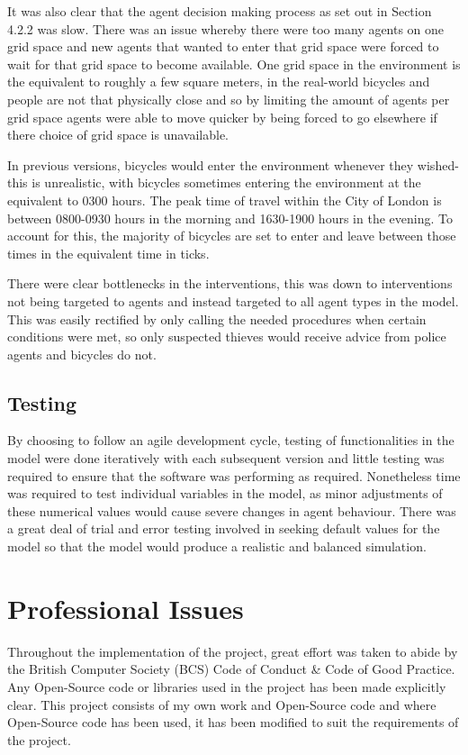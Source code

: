 \documentclass[11pt]{informatics-report}
\begin{document}
It was also clear that the agent decision making process as set out in Section 4.2.2 was slow. There was an issue whereby there were too many agents on one grid space and new agents that wanted to enter that grid space were forced to wait for that grid space to become available. One grid space in the environment is the equivalent to roughly a few square meters, in the real-world bicycles and people are not that physically close and so by limiting the amount of agents per grid space agents were able to move quicker by being forced to go elsewhere if there choice of grid space is unavailable. \par

In previous versions, bicycles would enter the environment whenever they wished- this is unrealistic, with bicycles sometimes entering the environment at the equivalent to 0300 hours. The peak time of travel within the City of London is between 0800-0930 hours in the morning and 1630-1900 hours in the evening. To account for this, the majority of bicycles are set to enter and leave between those times in the equivalent time in ticks. \par

There were clear bottlenecks in the interventions, this was down to interventions not being targeted to agents and instead targeted to all agent types in the model. This was easily rectified by only calling the needed procedures when certain conditions were met, so only suspected thieves would receive advice from police agents and bicycles do not.
\section{Testing}
By choosing to follow an agile development cycle, testing of functionalities in the model were done iteratively with each subsequent version and little testing was required to ensure that the software was performing as required. Nonetheless time was required to test individual variables in the model, as minor adjustments of these numerical values would cause severe changes in agent behaviour. There was a great deal of trial and error testing involved in seeking default values for the model so that the model would produce a realistic and balanced simulation.   

\chapter{Professional Issues}
Throughout the implementation of the project, great effort was taken to abide by the British Computer Society (BCS) Code of Conduct \& Code of Good Practice. Any Open-Source code or libraries used in the project has been made explicitly clear. This project consists of my own work and Open-Source code and where Open-Source code has been used, it has been modified to suit the requirements of the project. \par
\end{document}
